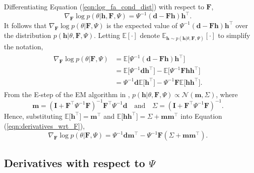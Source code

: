 \documentclass[msc,deptreport.inf]{infthesis} %
\newcommand{\matr}[1]{\mathbf{#1}}
\newcommand{\E}{\mathbb E}
\begin{document}
Differentiating Equation (\ref{eqn:log_fa_cond_dist}) with respect to $\matr{F}$,
\begin{equation}
	\nabla_{\matr{F}} \log p(\theta | \matr{h}, \matr{F}, \Psi)
	= \Psi^{-1} (\matr{d} - \matr{Fh}) \matr{h}^\intercal.
\end{equation}
It follows that $\nabla_{\matr{F}} \log p(\theta | \matr{F}, \Psi)$ is the expected value of $\Psi^{-1} (\matr{d} - \matr{Fh}) \matr{h}^\intercal$ over the distribution $p(\matr{h} | \theta, \matr{F}, \Psi)$. Letting $\E[\cdot]$ denote $\E_{\matr{h} \sim p(\matr{h} | \theta, \matr{F}, \Psi)}[\cdot]$ to simplify the notation, 
\begin{align}\label{eqn:derivatives_wrt_F}
\begin{split}
	\nabla_{\matr{F}} \log p(\theta | \matr{F}, \Psi) 
	& = \E \big[ \Psi^{-1} (\matr{d} - \matr{Fh}) \matr{h}^\intercal \big] \\
	& = \E \big[ \Psi^{-1} \matr{d} \matr{h}^\intercal \big] 
	- \E \big[ \Psi^{-1} \matr{Fh} \matr{h}^\intercal \big] \\
	& = \Psi^{-1} \matr{d} \E \big[ \matr{h}^\intercal \big] 
	- \Psi^{-1} \matr{F}  \E \big[ \matr{h} \matr{h}^\intercal \big].
\end{split}
\end{align} 
From the E-step of the EM algorithm in \cite{barber2007}, $p(\matr{h} | \theta, \matr{F}, \Psi) \propto \mathcal{N}(\matr{m}, \Sigma)$, where
\begin{equation}\label{eqn:variational_params}
	\matr{m} = (\matr{I} + \matr{F}^\intercal \Psi^{-1} \matr{F})^{-1} \matr{F}^\intercal \Psi^{-1} \matr{d}
	\quad \text{and} \quad \Sigma = (\matr{I} + \matr{F}^\intercal \Psi^{-1} \matr{F})^{-1}.
\end{equation}
Hence, substituting $\E \big[ \matr{h}^\intercal \big] = \matr{m}^\intercal$ and $\E \big[ \matr{h} \matr{h}^\intercal \big] = \Sigma + \matr{m} \matr{m}^\intercal$ into Equation (\ref{eqn:derivatives_wrt_F}), 
\begin{equation}
	\nabla_{\matr{F}} \log p(\theta | \matr{F}, \Psi) 
	= \Psi^{-1} \matr{d} \matr{m}^\intercal
	- \Psi^{-1} \matr{F}  (\Sigma + \matr{m} \matr{m}^\intercal).
\end{equation}

\subsection{Derivatives with respect to $\Psi$}
\end{document}
